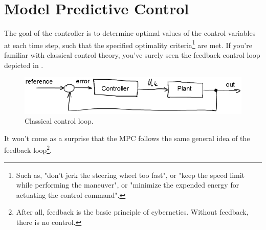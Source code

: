 \documentclass[a4paper]{article}
\begin{document}
\section{Model Predictive Control}\label{sec:model_predictive_control}
The goal of the controller is to determine optimal values of the control variables at each time step, such that the specified optimality criteria\footnote{Such as, "don't jerk the steering wheel too fast", or "keep the speed limit while performing the maneuver", or "minimize the expended energy for actuating the control command".} are met.
If you're familiar with classical control theory, you've surely seen the feedback control loop depicted in .
\begin{figure}[h]
	\centering
	\includegraphics[width=\columnwidth]{./img/control_loop.png}
	\caption{Classical control loop.}
	\label{fig:classical_control_loop}
\end{figure}
It won't come as a surprise that the MPC follows the same general idea of the feedback loop\footnote{After all, feedback is the basic principle of cybernetics. Without feedback, there is no control.}.
\end{document}
